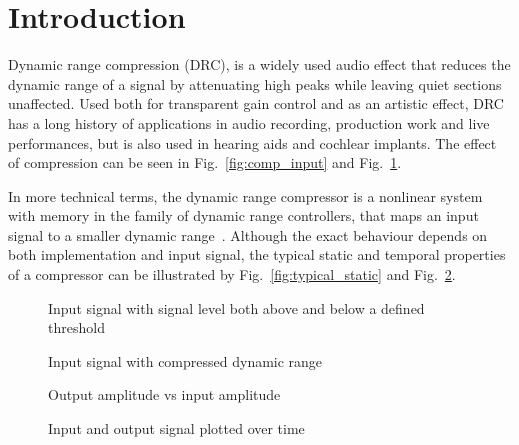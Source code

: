 \documentclass[../main2.tex]{subfiles}
\providecommand{\rootdir}{..}
\begin{document}
\section{Introduction}
Dynamic range compression (DRC), is a widely used audio effect that reduces the dynamic range of a signal by attenuating high peaks while leaving quiet sections unaffected. Used both for transparent gain control and as an artistic effect, DRC has a long history of applications in audio recording, production work and live performances, but is also used in hearing aids and cochlear implants. The effect of compression can be seen in Fig.~\ref{fig:comp_input} and Fig.~\ref{fig:comp_output}.

In more technical terms, the dynamic range compressor is a nonlinear system with memory in the family of dynamic range controllers, that maps an input signal to a smaller dynamic range~\cite{dafx11}. Although the exact behaviour depends on both implementation and input signal, the typical static and temporal properties of a compressor can be illustrated by Fig.~\ref{fig:typical_static} and Fig.~\ref{fig:typical_envelope}.

\begin{figure}[ht]
\captionsetup{justification=centering}

\begin{minipage}[t]{.5\textwidth}
 \centering

\caption{Input signal with signal level both above and below a defined threshold} 
\label{fig:comp_input}
\end{minipage}%
\begin{minipage}[t]{.5\textwidth}
\centering

\caption{Input signal with compressed dynamic range} 
\label{fig:comp_output}
\end{minipage}
\end{figure}

\begin{figure}[ht]
\captionsetup{justification=centering}

\begin{minipage}[t]{.5\textwidth}
 \centering

\caption{Output amplitude vs input amplitude} 
\label{fig:typical_static}
\end{minipage}%
\begin{minipage}[t]{.5\textwidth}
\centering

\caption{Input and output signal plotted over time} 
\label{fig:typical_envelope}
\end{minipage}
\end{figure}
\end{document}

